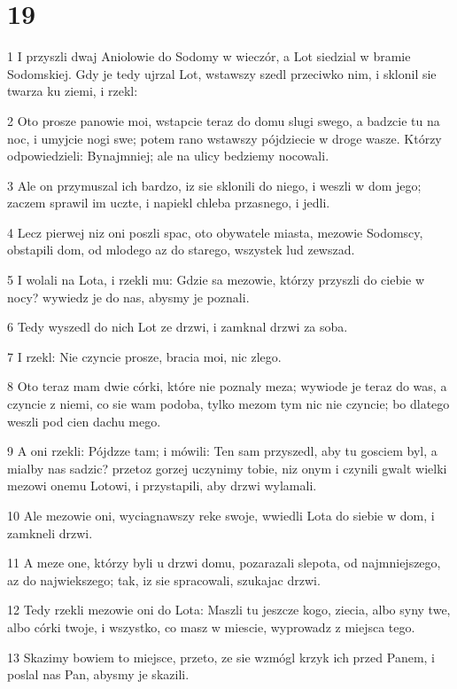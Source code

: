 \chapter{19}

\par 1 I przyszli dwaj Aniolowie do Sodomy w wieczór, a Lot siedzial w bramie Sodomskiej. Gdy je tedy ujrzal Lot, wstawszy szedl przeciwko nim, i sklonil sie twarza ku ziemi, i rzekl:
\par 2 Oto prosze panowie moi, wstapcie teraz do domu slugi swego, a badzcie tu na noc, i umyjcie nogi swe; potem rano wstawszy pójdziecie w droge wasze. Którzy odpowiedzieli: Bynajmniej; ale na ulicy bedziemy nocowali.
\par 3 Ale on przymuszal ich bardzo, iz sie sklonili do niego, i weszli w dom jego; zaczem sprawil im uczte, i napiekl chleba przasnego, i jedli.
\par 4 Lecz pierwej niz oni poszli spac, oto obywatele miasta, mezowie Sodomscy, obstapili dom, od mlodego az do starego, wszystek lud zewszad.
\par 5 I wolali na Lota, i rzekli mu: Gdzie sa mezowie, którzy przyszli do ciebie w nocy? wywiedz je do nas, abysmy je poznali.
\par 6 Tedy wyszedl do nich Lot ze drzwi, i zamknal drzwi za soba.
\par 7 I rzekl: Nie czyncie prosze, bracia moi, nic zlego.
\par 8 Oto teraz mam dwie córki, które nie poznaly meza; wywiode je teraz do was, a czyncie z niemi, co sie wam podoba, tylko mezom tym nic nie czyncie; bo dlatego weszli pod cien dachu mego.
\par 9 A oni rzekli: Pójdzze tam; i mówili: Ten sam przyszedl, aby tu gosciem byl, a mialby nas sadzic? przetoz gorzej uczynimy tobie, niz onym i czynili gwalt wielki mezowi onemu Lotowi, i przystapili, aby drzwi wylamali.
\par 10 Ale mezowie oni, wyciagnawszy reke swoje, wwiedli Lota do siebie w dom, i zamkneli drzwi.
\par 11 A meze one, którzy byli u drzwi domu, pozarazali slepota, od najmniejszego, az do najwiekszego; tak, iz sie spracowali, szukajac drzwi.
\par 12 Tedy rzekli mezowie oni do Lota: Maszli tu jeszcze kogo, ziecia, albo syny twe, albo córki twoje, i wszystko, co masz w miescie, wyprowadz z miejsca tego.
\par 13 Skazimy bowiem to miejsce, przeto, ze sie wzmógl krzyk ich przed Panem, i poslal nas Pan, abysmy je skazili.
